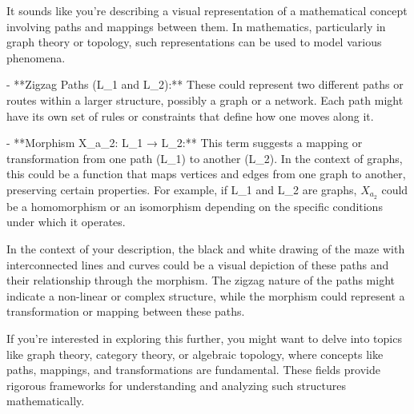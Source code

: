 It sounds like you're describing a visual representation of a mathematical concept involving paths and mappings between them. In mathematics, particularly in graph theory or topology, such representations can be used to model various phenomena.

- **Zigzag Paths (L_1 and L_2):** These could represent two different paths or routes within a larger structure, possibly a graph or a network. Each path might have its own set of rules or constraints that define how one moves along it.
  
- **Morphism X_a_2: L_1 → L_2:** This term suggests a mapping or transformation from one path (L_1) to another (L_2). In the context of graphs, this could be a function that maps vertices and edges from one graph to another, preserving certain properties. For example, if L_1 and L_2 are graphs, \(X_{a_2}\) could be a homomorphism or an isomorphism depending on the specific conditions under which it operates.

In the context of your description, the black and white drawing of the maze with interconnected lines and curves could be a visual depiction of these paths and their relationship through the morphism. The zigzag nature of the paths might indicate a non-linear or complex structure, while the morphism could represent a transformation or mapping between these paths.

If you're interested in exploring this further, you might want to delve into topics like graph theory, category theory, or algebraic topology, where concepts like paths, mappings, and transformations are fundamental. These fields provide rigorous frameworks for understanding and analyzing such structures mathematically.